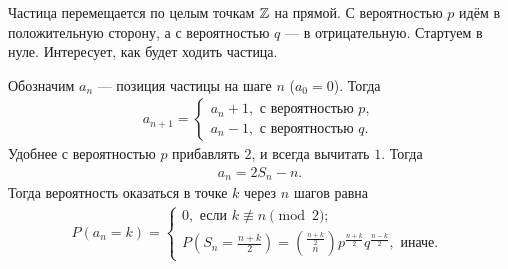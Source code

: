 \begin{exmpl}
 Частица перемещается по целым точкам $\mathbb{Z}$ на прямой. С вероятностью $p$ идём в положительную сторону, а с вероятностью $q$ --- в отрицательную. Стартуем в нуле. Интересует, как будет ходить частица.

 Обозначим $a_n$ --- позиция частицы на шаге $n$ ($a_0 = 0$). Тогда
 \begin{align*}
  a_{n+1} = \begin{cases}
   a_n + 1, \text{ с вероятностью } p,  \\
   a_n - 1, \text{ с вероятностью } q.
  \end{cases}
 \end{align*} Удобнее с вероятностью $p$ прибавлять $2$, и всегда вычитать $1$. Тогда
 \begin{align*}
  a_n = 2S_n - n.
 \end{align*} Тогда вероятность оказаться в точке $k$ через $n$ шагов равна
 \begin{align*}
  P(a_n = k) = \begin{cases}
   0, \text{ если } k \not \equiv n \pmod 2;  \\
   P(S_n = \frac{n+k}{2}) = \binom {\frac{n+k}{2}} n p^{\frac{n+k}{2}} q^{\frac{n-k}{2}}, \text{ иначе. }
  \end{cases} 
 \end{align*} 
\end{exmpl}

